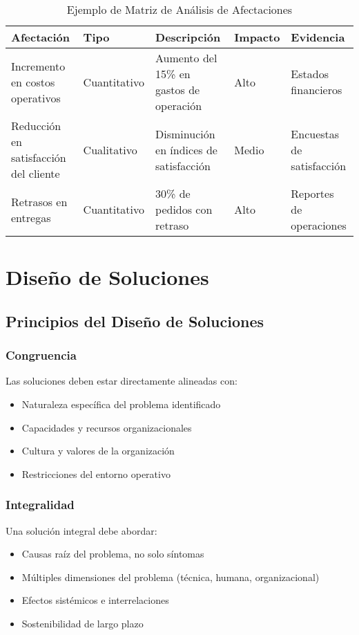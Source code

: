 \documentclass[12pt,letterpaper,oneside]{book}
\begin{document}
\begin{table}[H]
\centering
\caption{Ejemplo de Matriz de Análisis de Afectaciones}
\begin{tabular}{|p{3cm}|p{2cm}|p{4cm}|p{2cm}|p{3cm}|}
\hline
\textbf{Afectación} & \textbf{Tipo} & \textbf{Descripción} & \textbf{Impacto} & \textbf{Evidencia} \\
\hline
Incremento en costos operativos & Cuantitativo & Aumento del 15\% en gastos de operación & Alto & Estados financieros \\
\hline
Reducción en satisfacción del cliente & Cualitativo & Disminución en índices de satisfacción & Medio & Encuestas de satisfacción \\
\hline
Retrasos en entregas & Cuantitativo & 30\% de pedidos con retraso & Alto & Reportes de operaciones \\
\hline
\end{tabular}
\end{table}

\section{Diseño de Soluciones}

\subsection{Principios del Diseño de Soluciones}

\subsubsection{Congruencia}

Las soluciones deben estar directamente alineadas con:
\begin{itemize}
\item Naturaleza específica del problema identificado
\item Capacidades y recursos organizacionales
\item Cultura y valores de la organización
\item Restricciones del entorno operativo
\end{itemize}

\subsubsection{Integralidad}

Una solución integral debe abordar:
\begin{itemize}
\item Causas raíz del problema, no solo síntomas
\item Múltiples dimensiones del problema (técnica, humana, organizacional)
\item Efectos sistémicos e interrelaciones
\item Sostenibilidad de largo plazo
\end{itemize}
\end{document}
